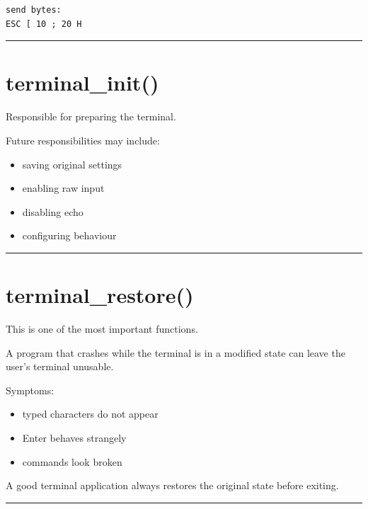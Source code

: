 \documentclass[
  oneside,
  openany]{book}
\providecommand{\tightlist}{%
  \setlength{\itemsep}{0pt}\setlength{\parskip}{0pt}}
\begin{document}
\begin{verbatim}
send bytes:
ESC [ 10 ; 20 H
\end{verbatim}

\begin{center}\rule{0.5\linewidth}{0.5pt}\end{center}

\hypertarget{terminal_init}{%
\section{terminal\_init()}\label{terminal_init}}

Responsible for preparing the terminal.

Future responsibilities may include:

\begin{itemize}
\tightlist
\item
  saving original settings
\item
  enabling raw input
\item
  disabling echo
\item
  configuring behaviour
\end{itemize}

\begin{center}\rule{0.5\linewidth}{0.5pt}\end{center}

\hypertarget{terminal_restore}{%
\section{terminal\_restore()}\label{terminal_restore}}

This is one of the most important functions.

A program that crashes while the terminal is in a modified state can
leave the user's terminal unusable.

Symptoms:

\begin{itemize}
\tightlist
\item
  typed characters do not appear
\item
  Enter behaves strangely
\item
  commands look broken
\end{itemize}

A good terminal application always restores the original state before
exiting.

\begin{center}\rule{0.5\linewidth}{0.5pt}\end{center}
\end{document}
